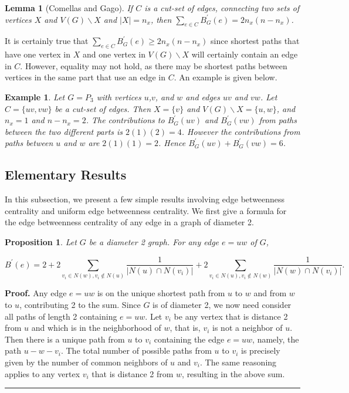\documentclass{article}%
\newtheorem{example}{Example}[section]
\newtheorem{lemma}{Lemma}[section]
\newtheorem{proposition}{Proposition}[section]
\newenvironment{proof}[1][Proof]{\textbf{#1.} }{\ \rule{0.5em}{0.5em}}
\begin{document}
\begin{lemma}
[Comellas and Gago]If $C$ is a cut-set of edges, connecting two sets of
vertices $X$ and $V(G)\backslash X$ and $\left\vert X\right\vert =n_{x}$, then
${\textstyle\sum\limits_{e\in C}} B_{G}^{\prime}(e)=2n_{x}(n-n_{x})$.
\end{lemma}

It is certainly true that ${\textstyle\sum\limits_{e\in C}}B_{G}^{\prime
}(e)\geq2n_{x}(n-n_{x})$ since shortest paths that have one vertex in $X$ and
one vertex in $V(G)\backslash X$ will certainly contain an edge in $C$.
However, equality may not hold, as there may be shortest paths between
vertices in the same part that use an edge in $C$. An example is given below.

\begin{example}
Let $G=P_{3}$ with vertices $u$,$v$, and $w$ and edges $uv$ and $vw$. Let
$C=\{uv,vw\}$ be a cut-set of edges. Then $X=\{v\}$ and $V(G)\backslash
X=\{u,w\}$, and $n_{x}=1$ and $n-n_{x}=2$. The contributions to $B_{G}%
^{\prime}(uv)$ and $B_{G}^{\prime}(vw)$ from paths between the two different
parts is $2(1)(2)=4$. However the contributions from paths between $u$ and $w$
are $2(1)(1)=2$. Hence $B_{G}^{\prime}(uv)+B_{G}^{\prime}(vw)=6$.
\end{example}

\subsection{Elementary Results}

In this subsection, we present a few simple results involving edge betweenness
centrality and uniform edge betweenness centrality. We first give a formula
for the edge betweenness centrality of any edge in a graph of diameter 2.

\begin{proposition}
\noindent Let $G$ be a diameter 2 graph. For any edge $e=uw$ of $G$,%

\[
B^{\prime}(e)=2+2\sum_{v_{i}\in N(w),v_{i}\notin N(u)}\frac{1}{|N(u)\cap
N(v_{i})|}+2\sum_{v_{i}\in N(u),v_{i}\notin N(w)}\frac{1}{|N(w)\cap N(v_{i}%
)|}.
\]

\end{proposition}

\begin{proof}
\noindent Any edge $e=uw$ is on the unique shortest path from $u$ to $w$ and
from $w$ to $u$, contributing 2 to the sum. Since $G$ is of diameter 2, we now
need consider all paths of length 2 containing $e=uw$. Let $v_{i}$ be any
vertex that is distance 2 from $u$ and which is in the neighborhood of $w$,
that is, $v_{i}$ is not a neighbor of $u$. Then there is a unique path from
$u$ to $v_{i}$ containing the edge $e=uw$, namely, the path $u-w-v_{i}$. The
total number of possible paths from $u$ to $v_{i}$ is precisely given by the
number of common neighbors of $u$ and $v_{i}$. The same reasoning applies to
any vertex $v_{i}$ that is distance 2 from $w$, resulting in the above sum.
\end{proof}
\end{document}
